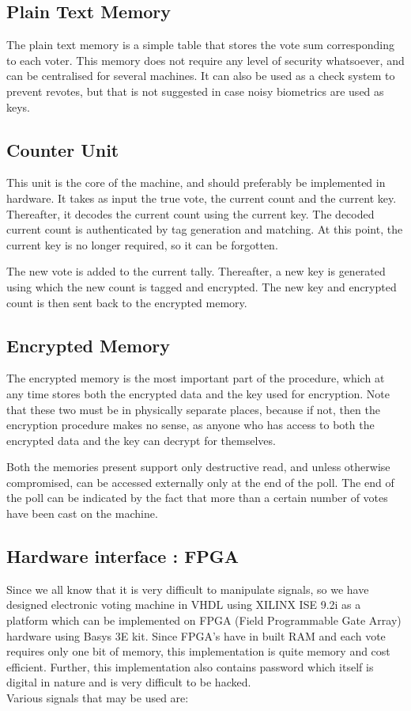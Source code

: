 \documentclass{article}
\begin{document}
\subsection{Plain Text Memory}
The plain text memory is a simple table that stores the vote sum corresponding to each voter. This memory does not require any level of security whatsoever, and can be centralised for several machines. It can also be used as a check system to prevent revotes, but that is not suggested in case noisy biometrics are used as keys.

\subsection{Counter Unit}
This unit is the core of the machine, and should preferably be implemented in hardware. It takes as input the true vote, the current count and the current key. Thereafter, it decodes the current count using the current key. The decoded current count is authenticated by tag generation and matching. At this point, the current key is no longer required, so it can be forgotten. 

The new vote is added to the current tally. Thereafter, a new key is generated using which the new count is tagged and encrypted. The new key and encrypted count is then sent back to the encrypted memory. 

\subsection{Encrypted Memory}
The encrypted memory is the most important part of the procedure, which at any time stores both the encrypted data and the key used for encryption. Note that these two must be in physically separate places, because if not, then the encryption procedure makes no sense, as anyone who has access to both the encrypted data and the key can decrypt for themselves.  

Both the memories present support only destructive read, and unless otherwise compromised, can be accessed externally only at the end of the poll. The end of the poll can be indicated by the fact that more than a certain number of votes have been cast on the machine.

\subsection{Hardware interface : FPGA}

Since we all know that it is very difficult to manipulate signals, so we have designed electronic voting machine in
VHDL using XILINX ISE 9.2i as a platform which can be implemented on FPGA (Field Programmable Gate Array) hardware using Basys 3E kit. Since FPGA’s have in built RAM and each vote requires only one bit of memory, this implementation is quite
memory and cost efficient. Further, this implementation also contains password which itself is digital in nature and is very difficult to be hacked. \\Various signals that may be used are:
\end{document}
